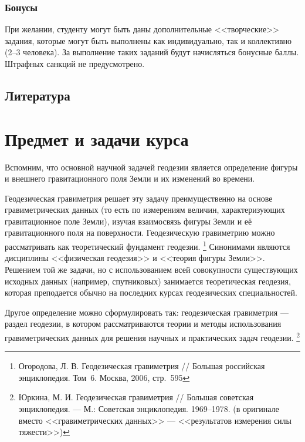 \documentclass[11pt, a4paper]{article}
\theoremstyle{plain}
\theoremstyle{definition}
\theoremstyle{remark}
\begin{document}
\subsubsection{Бонусы}

При желании, студенту могут быть даны дополнительные <<творческие>> задания, которые могут быть
выполнены как индивидуально, так и коллективно (2--3 человека). За выполнение таких заданий будут
начисляться бонусные баллы. Штрафных санкций не предусмотрено.

\subsection{Литература}
\begin{refsection}
    \nocite{Shimbirev1975, Ogorodova2013, Yuzefovich2014}
    \printbibliography[title={\normalsize Рекомендуемая литература}]
\end{refsection}
\begin{refsection}
    \nocite{Yuzefovich1980, Torge1999, Ogorodova2006, Pellinen1978, Moritz2007, Moritz1983, Ogorodova2011}
    \printbibliography[title={\normalsize Дополнительная литература}]
\end{refsection}

\section{Предмет и задачи курса}
Вспомним, что основной научной задачей геодезии является определение фигуры и внешнего
гравитационного поля Земли и их изменений во времени. 

Геодезическая гравиметрия решает эту задачу
преимущественно на основе гравиметрических данных (то есть по измерениям величин,
характеризующих гравитационное поле Земли), изучая взаимосвязь фигуры Земли и её гравитационного
поля на поверхности. 
Геодезическую гравиметрию можно рассматривать как теоретический фундамент геодезии.
\footnote{Огородова, Л. В. Геодезическая гравиметрия // 
    Большая российская энциклопедия. Том~6. Москва, 2006, стр.~595}
Синонимами являются дисциплины <<физическая геодезия>> и <<теория фигуры Земли>>.
Решением той же задачи, но с использованием всей
совокупности существующих исходных данных (например, спутниковых) занимается теоретическая
геодезия, которая преподается обычно на последних курсах геодезических специальностей.

Другое определение можно сформулировать так: геодезическая гравиметрия ---
раздел геодезии, в котором рассматриваются теории и методы использования гравиметрических данных 
для решения научных и практических задач геодезии.
\footnote{Юркина, М. И. Геодезическая гравиметрия // Большая советская энциклопедия. --- М.:
Советская энциклопедия. 1969--1978. (в оригинале вместо <<гравиметрических данных>> ---
<<результатов измерения силы тяжести>>)}
\end{document}
